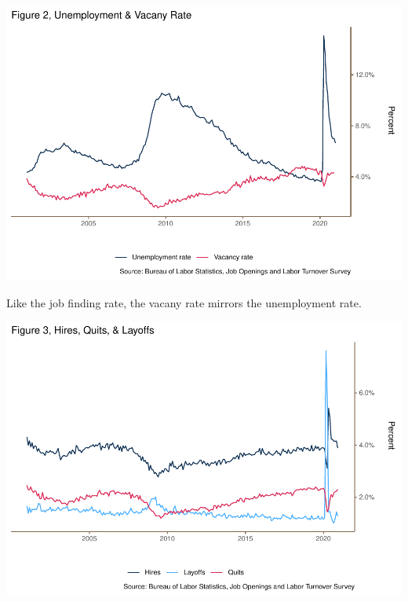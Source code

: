 \documentclass[
  11pt,
]{article}
\begin{document}
\begin{center}\includegraphics{JOLTS_files/figure-latex/unnamed-chunk-6-1} \end{center}

Like the job finding rate, the vacany rate mirrors the unemployment
rate.

\begin{center}\includegraphics{JOLTS_files/figure-latex/unnamed-chunk-7-1} \end{center}
\end{document}
